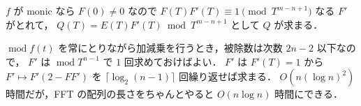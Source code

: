 \documentclass{jsarticle}
\DeclareMathOperator{\Mod}{mod}
\begin{document}
$f$ が monic なら $F(0) \ne 0$ なので $F(T) F'(T) \equiv 1 \pmod{T^{m-n+1}}$ なる $F'$ がとれて，
$Q(T) = E(T) F'(T) \bmod T^{m-n+1}$ として $Q$ が求まる．

$\Mod f(t)$ を常にとりながら加減乗を行うとき，被除数は次数 $2 n - 2$ 以下なので，
$F'$ は $\Mod T^{n-1}$ で $1$ 回求めておけばよい．
$F'$ は $F'(T) = 1$ から $F' \mapsto F' (2 - F F')$ を $\lceil \log_2 (n - 1) \rceil$ 回繰り返せば求まる．
$O(n (\log n)^2)$ 時間だが，FFT の配列の長さをちゃんとやると $O(n \log n)$ 時間にできる．
\end{document}
